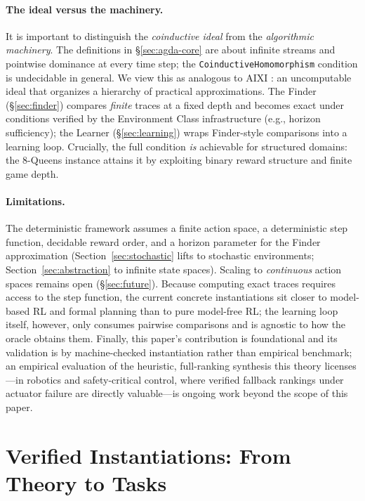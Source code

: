 \documentclass[runningheads]{llncs}
\begin{document}
\paragraph{The ideal versus the machinery.}
It is important to distinguish the \emph{coinductive ideal} from the \emph{algorithmic machinery}.  The definitions in \S\ref{sec:agda-core} are about infinite streams and pointwise dominance at every time step; the \texttt{CoinductiveHomomorphism} condition is undecidable in general.  We view this as analogous to AIXI \cite{Hutter2005}: an uncomputable ideal that organizes a hierarchy of practical approximations.  The Finder (\S\ref{sec:finder}) compares \emph{finite} traces at a fixed depth and becomes exact under conditions verified by the Environment Class infrastructure (e.g., horizon sufficiency); the Learner (\S\ref{sec:learning}) wraps Finder-style comparisons into a learning loop.  Crucially, the full condition \emph{is} achievable for structured domains: the 8-Queens instance attains it by exploiting binary reward structure and finite game depth.

\paragraph{Limitations.}
The deterministic framework assumes a finite action space, a deterministic step function, decidable reward order, and a horizon parameter for the Finder approximation (Section~\ref{sec:stochastic} lifts to stochastic environments; Section~\ref{sec:abstraction} to infinite state spaces).  Scaling to \emph{continuous} action spaces remains open (\S\ref{sec:future}).  Because computing exact traces requires access to the step function, the current concrete instantiations sit closer to model-based RL and formal planning than to pure model-free RL; the learning loop itself, however, only consumes pairwise comparisons and is agnostic to how the oracle obtains them.  Finally, this paper's contribution is foundational and its validation is by machine-checked instantiation rather than empirical benchmark; an empirical evaluation of the heuristic, full-ranking synthesis this theory licenses---in robotics and safety-critical control, where verified fallback rankings under actuator failure are directly valuable---is ongoing work beyond the scope of this paper.

\section{Verified Instantiations: From Theory to Tasks}
\end{document}
